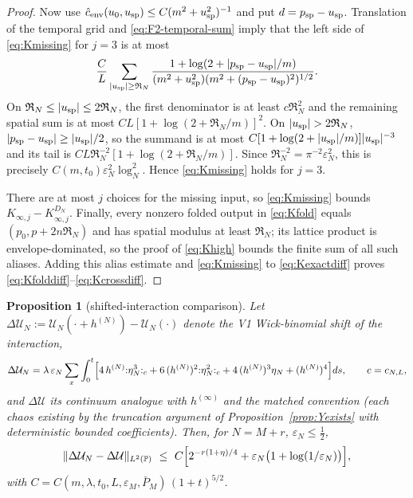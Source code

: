 \documentclass[11pt,a4paper]{article}
\theoremstyle{plain}
\newtheorem{proposition}[theorem]{Proposition}
\theoremstyle{definition}
\newcommand{\PP}{\mathbb{P}}
\newcommand{\eps}{\varepsilon}
\newcommand{\U}{\mathcal U}
\begin{document}
\begin{proof}
Now use $\hat c_{\rm env}(u_0,u_{\rm sp})\le
C(m^2+u_{\rm sp}^2)^{-1}$ and put $d=p_{\rm sp}-u_{\rm sp}$.  Translation
of the temporal grid and \eqref{eq:F2-temporal-sum} imply that the left side of
\eqref{eq:Kmissing} for $j=3$ is at most
\[
 \frac{C}{L}\sum_{|u_{\rm sp}|\ge\mathfrak R_N}
 \frac{1+\log(2+|p_{\rm sp}-u_{\rm sp}|/m)}
 {(m^2+u_{\rm sp}^2)(m^2+(p_{\rm sp}-u_{\rm sp})^2)^{1/2}}.
\]
On $\mathfrak R_N\le|u_{\rm sp}|\le2\mathfrak R_N$, the first
denominator is at least $c\mathfrak R_N^2$ and the remaining spatial sum
is at most $CL[1+\log(2+\mathfrak R_N/m)]^2$.  On
$|u_{\rm sp}|>2\mathfrak R_N$, $|p_{\rm sp}-u_{\rm sp}|\ge
|u_{\rm sp}|/2$, so the summand is at most
$C[1+\log(2+|u_{\rm sp}|/m)]|u_{\rm sp}|^{-3}$ and its tail is
$CL\mathfrak R_N^{-2}[1+\log(2+\mathfrak R_N/m)]$.  Since
$\mathfrak R_N^{-2}=\pi^{-2}\eps_N^2$, this is precisely
$C(m,t_0)\eps_N^2\log_N^2$.  Hence \eqref{eq:Kmissing} holds for $j=3$.

There are at most $j$ choices for the missing input, so
\eqref{eq:Kmissing} bounds
$K_{\infty,j}-K_{\infty,j}^{D_N}$.  Finally, every nonzero folded output in
\eqref{eq:Kfold} equals $(p_0,p+2n\mathfrak R_N)$ and has spatial modulus at
least $\mathfrak R_N$; its lattice product is envelope-dominated, so the proof
of \eqref{eq:Khigh} bounds the finite sum of all such aliases.  Adding this
alias estimate and \eqref{eq:Kmissing} to \eqref{eq:Kexactdiff} proves
\eqref{eq:Kfolddiff}--\eqref{eq:Kcrossdiff}.
\end{proof}

\begin{proposition}[shifted-interaction comparison]\label{prop:shifted}
Let $\Delta\U_N:=\U_N(\cdot+h^{(N)})-\U_N(\cdot)$ denote the V1
Wick-binomial shift of the interaction,
\[
 \Delta\U_N=\lambda\,\eps_N\sum_x\int_0^t
 \Bigl[4\,h^{(N)}{:}\eta_N^3{:}_{c}+6\,(h^{(N)})^2{:}\eta_N^2{:}_{c}
 +4\,(h^{(N)})^3\eta_N+(h^{(N)})^4\Bigr]ds,
 \qquad c=c_{N,L},
\]
and $\Delta\U$ its continuum analogue with $h^{(\infty)}$ and the matched
convention (each chaos existing by the truncation argument of
Proposition~\ref{prop:Yexists} with deterministic bounded coefficients).
Then, for $N=M+r$, $\eps_N\le\tfrac12$,
\[
 \|\Delta\U_N-\Delta\U\|_{L^2(\PP)}
 \ \le\ C\Bigl[2^{-r(1+\eta)/4}
 +\eps_N\bigl(1+\log(1/\eps_N)\bigr)\Bigr],
\]
with $C=C(m,\lambda,t_0,L,\eps_M,\bar P_M)\,(1+t)^{5/2}$.
\end{proposition}
\end{document}
